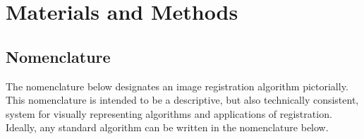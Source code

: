 \documentclass{frontiersSCNS}
\begin{document}
\section{Materials and Methods}
\subsection{Nomenclature}
The nomenclature below designates an image registration
algorithm pictorially.  This nomenclature is intended to be a
descriptive, but also technically consistent, system for visually
representing algorithms and applications of registration.  Ideally,
any standard algorithm can be written in the nomenclature below.
\newline
\noindent\makebox[\linewidth]{\rule{\textwidth}{0.4pt}}
\newline
{}
\vspace{0.1in}
\end{document}
